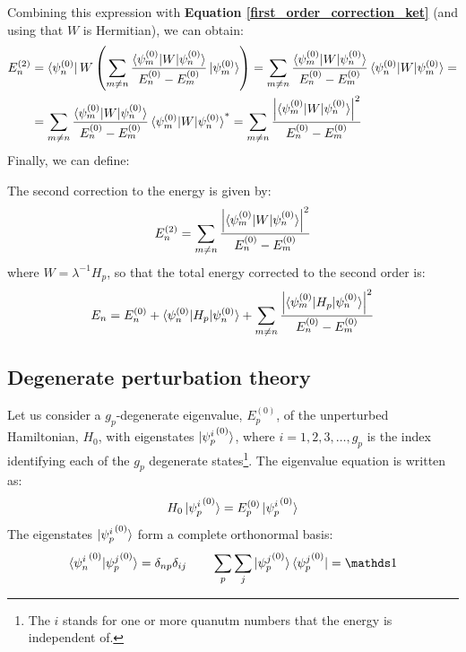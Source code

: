 Combining this expression with \textbf{Equation \ref{first_order_correction_ket}} (and using that $W$ is Hermitian), we can obtain:
\begin{equation}
    \begin{split}
        E_n^{(2)} &= \bra{\psi_n^{(0)}}W \left(\sum_{m\neq n} \frac{\braket{\psi_m^{(0)}|W|\psi_n^{(0)}}}{E_n^{(0)} - E_m^{(0)}}\ket{\psi_m^{(0)}}\right) = \sum_{m\neq n} \frac{\braket{\psi_m^{(0)}|W|\psi_n^{(0)}}}{E_n^{(0)} - E_m^{(0)}}\braket{\psi_n^{(0)}|W|\psi_m^{(0)}} = \\
        &= \sum_{m\neq n} \frac{\braket{\psi_m^{(0)}|W|\psi_n^{(0)}}}{E_n^{(0)} - E_m^{(0)}}\braket{\psi_m^{(0)}|W|\psi_n^{(0)}}^* = \sum_{m\neq n} \frac{\left|\braket{\psi_m^{(0)}|W|\psi_n^{(0)}}\right|^2}{E_n^{(0)} - E_m^{(0)}} \\
    \end{split}
\end{equation}
Finally, we can define:
\begin{definition}
    The second correction to the energy is given by:
    \begin{equation}
        E_n^{(2)} = \sum_{m\neq n} \frac{\left|\braket{\psi_m^{(0)}|W|\psi_n^{(0)}}\right|^2}{E_n^{(0)} - E_m^{(0)}}
    \end{equation}
    where $W = \lambda^{-1}H_p$, so that the total energy corrected to the second order is:
    \begin{equation}
        E_n = E_n^{(0)} + \braket{\psi_n^{(0)}|H_p|\psi_n^{(0)}} + \sum_{m\neq n} \frac{\left|\braket{\psi_m^{(0)}|H_p|\psi_n^{(0)}}\right|^2}{E_n^{(0)} - E_m^{(0)}}
    \end{equation}
\end{definition}

\subsection{Degenerate perturbation theory}


Let us consider a $g_p$-degenerate eigenvalue, $E_p^{(0)}$, of the unperturbed Hamiltonian, $H_0$, with eigenstates $\ket{{\psi_p^i}^{(0)}}$, where $i = 1, 2, 3, \dots , g_p$ is the index identifying each of the $g_p$ degenerate states\footnote{The $i$ stands for one or more quanutm numbers that the energy is independent of.}. The eigenvalue equation is written as:
\begin{equation}
    H_0 \ket{{\psi_p^i}^{(0)}} = E_p^{(0)} \ket{{\psi_p^i}^{(0)}}
\end{equation}
The eigenstates $\ket{{\psi_p^i}^{(0)}}$ form a complete orthonormal basis:
\begin{equation}
    \braket{{\psi_n^i}^{(0)}|{\psi_p^j}^{(0)}} = \delta_{np}\delta_{ij} \qquad \sum_p\sum_j \ket{{\psi_p^j}^{(0)}}\bra{{\psi_p^j}^{(0)}} = \Imat
\end{equation}

